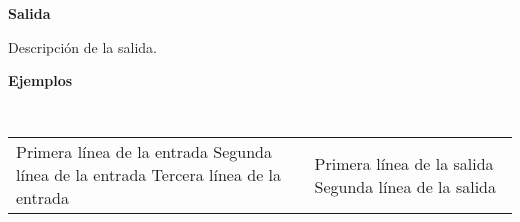 \documentclass{article}
\newenvironment{SpanishTestCases}
{ 
	\vspace{-4mm}
	\begingroup
	\tt
	\renewcommand{\arraystretch}{1.5} %
	\begin{longtable}{| p{85mm} | p{85mm} |}
		\hline
		{\sf {\bfseries Entrada}} & {\sf {\bfseries Salida}} \\ \hline
		\endfirsthead
}
{
	\end{longtable}
	\endgroup
}
\newcommand{\printSubtitle}[1]{
	\vspace{1mm}
	\begin{flushleft} {\Large \sf \bfseries #1 \newline} \end{flushleft}
	\vspace{-4mm}
}
\newcommand{\addTest}[2]{
	#1 %
	&
	#2 %
	\\
	\hline
}
\begin{document}
\printSubtitle{Salida}

Descripción de la salida.
\newline




\printSubtitle{Ejemplos}

\begin{SpanishTestCases}
    \addTest{
		Primera línea de la entrada \newline
		Segunda línea de la entrada \newline
		Tercera línea de la entrada
	}
	{
		Primera línea de la salida \newline
		Segunda línea de la salida
	}
\end{SpanishTestCases}
\end{document}
